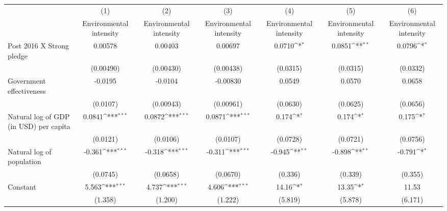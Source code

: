 {
\def\sym#1{\ifmmode^{#1}\else\(^{#1}\)\fi}
\begin{tabular}{l*{6}{c}}
\hline\hline
                    &\multicolumn{1}{c}{(1)}&\multicolumn{1}{c}{(2)}&\multicolumn{1}{c}{(3)}&\multicolumn{1}{c}{(4)}&\multicolumn{1}{c}{(5)}&\multicolumn{1}{c}{(6)}\\
                    &\multicolumn{1}{c}{Environmental intensity}&\multicolumn{1}{c}{Environmental intensity}&\multicolumn{1}{c}{Environmental intensity}&\multicolumn{1}{c}{Environmental intensity}&\multicolumn{1}{c}{Environmental intensity}&\multicolumn{1}{c}{Environmental intensity}\\
\hline
Post 2016 X Strong pledge&     0.00578         &     0.00403         &     0.00697         &      0.0710\sym{*}  &      0.0851\sym{**} &      0.0796\sym{*}  \\
                    &   (0.00490)         &   (0.00430)         &   (0.00438)         &    (0.0315)         &    (0.0315)         &    (0.0332)         \\
[1em]
Government effectiveness&     -0.0195         &     -0.0104         &    -0.00830         &      0.0549         &      0.0570         &      0.0658         \\
                    &    (0.0107)         &   (0.00943)         &   (0.00961)         &    (0.0630)         &    (0.0625)         &    (0.0656)         \\
[1em]
Natural log of GDP (in USD) per capita&      0.0841\sym{***}&      0.0872\sym{***}&      0.0871\sym{***}&       0.174\sym{*}  &       0.174\sym{*}  &       0.175\sym{*}  \\
                    &    (0.0121)         &    (0.0106)         &    (0.0107)         &    (0.0728)         &    (0.0721)         &    (0.0756)         \\
[1em]
Natural log of population&      -0.361\sym{***}&      -0.318\sym{***}&      -0.311\sym{***}&      -0.945\sym{**} &      -0.898\sym{**} &      -0.791\sym{*}  \\
                    &    (0.0745)         &    (0.0658)         &    (0.0670)         &     (0.336)         &     (0.339)         &     (0.355)         \\
[1em]
Constant            &       5.563\sym{***}&       4.737\sym{***}&       4.606\sym{***}&       14.16\sym{*}  &       13.35\sym{*}  &       11.53         \\
                    &     (1.358)         &     (1.200)         &     (1.222)         &     (5.819)         &     (5.878)         &     (6.171)         \\

\end{tabular}}
